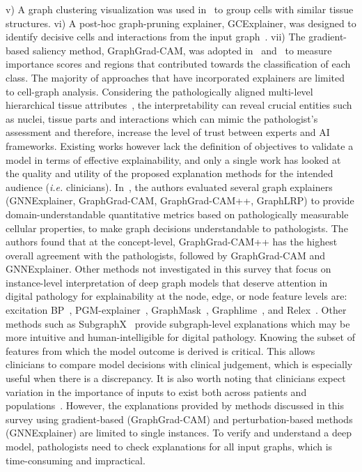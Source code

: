 v) A graph clustering visualization was used in~ to group cells with similar tissue structures.
vi) A post-hoc graph-pruning explainer, GCExplainer, was designed to identify decisive cells and interactions from the input graph~. 
vii) The gradient-based saliency method, GraphGrad-CAM, was adopted in~ and~ to measure importance scores and regions that contributed towards the classification of each class.
The majority of approaches that have incorporated explainers are limited to cell-graph analysis. Considering the pathologically aligned multi-level hierarchical tissue attributes{~}, the interpretability can reveal crucial entities such as nuclei, tissue parts and interactions which can mimic the pathologist's assessment and therefore, increase the level of trust between experts and AI frameworks.
Existing works however lack the definition of objectives to validate a model in terms of effective explainability, and only a single work has looked at the quality and utility of the proposed explanation methods for the intended audience (\textit{i.e.} clinicians). In~, the authors evaluated several graph explainers (GNNExplainer, GraphGrad-CAM, GraphGrad-CAM++, GraphLRP) to provide domain-understandable quantitative metrics based on pathologically measurable cellular properties, to make graph decisions understandable to pathologists. The authors found that at the concept-level, GraphGrad-CAM++ has the highest overall agreement with the pathologists, followed by GraphGrad-CAM and GNNExplainer.
Other methods not investigated in this survey that focus on instance-level interpretation of deep graph models that deserve attention in digital pathology for explainability at the node, edge, or node feature levels are: excitation BP~, PGM-explainer~, GraphMask~, Graphlime~, and Relex~.
Other methods such as SubgraphX~ provide subgraph-level explanations which may be more intuitive and human-intelligible for digital pathology.
Knowing the subset of features from which the model outcome is derived is critical. This allows clinicians to compare model decisions with clinical judgement, which is especially useful when there is a discrepancy. It is also worth noting that clinicians expect variation in the importance of inputs to exist both across patients and populations~. 
However, the explanations provided by methods discussed in this survey using gradient-based (GraphGrad-CAM) and perturbation-based methods (GNNExplainer) are limited to single instances. To verify and understand a deep model, pathologists need to check explanations for all input graphs, which is time-consuming and impractical. 
